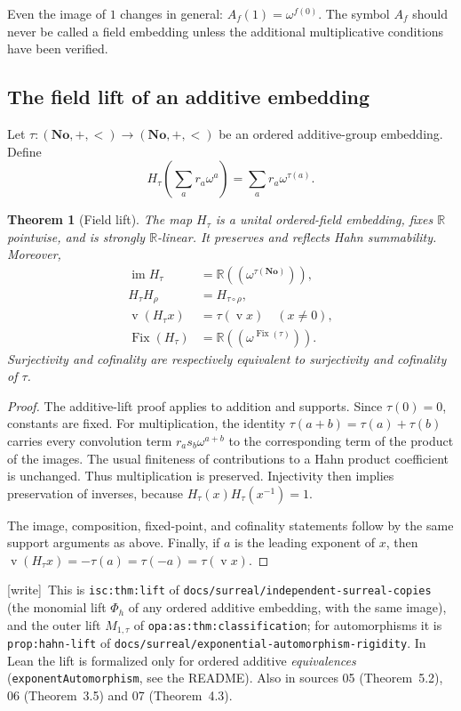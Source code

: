 \documentclass[11pt,a4paper]{article}
\numberwithin{equation}{section}
\theoremstyle{plain}
\newtheorem{theorem}{Theorem}[section]
\theoremstyle{definition}
\theoremstyle{remark}
\newcommand{\No}{\mathbf{No}}
\newcommand{\R}{\mathbb{R}}
\newcommand{\Fix}{\operatorname{Fix}}
\newcommand{\im}{\operatorname{im}}
\newcommand{\NF}[1]{\R((\omega^{#1}))}
\newcommand{\val}{\operatorname{v}}
\newcommand{\code}[1]{\texttt{\small #1}}
\newcommand{\lbl}[1]{\nolinkurl{#1}}%
\newcommand{\fn}[1]{\nolinkurl{#1}}%
\newcommand{\wtag}{\textup{\textsf{[write]}}}%
\newenvironment{wnote}{\par\smallskip\noindent\wtag\ }{\par\smallskip}
\begin{document}
Even the image of $1$ changes in general: $A_f(1)=\omega^{f(0)}$.
The symbol $A_f$ should never be called a field embedding unless the
additional multiplicative conditions have been verified.

\subsection{The field lift of an additive embedding}
Let $\tau:(\No,+,<)\to(\No,+,<)$ be an ordered additive-group embedding.
Define
\begin{equation}\label{sse:eq:fieldlift}
 H_\tau\left(\sum_a r_a\omega^a\right)
       =\sum_a r_a\omega^{\tau(a)}.
\end{equation}

\begin{theorem}[Field lift]\label{sse:thm:fieldlift}
The map $H_\tau$ is a unital ordered-field embedding, fixes $\R$ pointwise,
and is strongly $\R$-linear. It preserves and reflects Hahn summability.
Moreover,
\begin{align}
 \im H_\tau&=\NF{\tau(\No)},\label{sse:eq:fieldimage}\\
 H_\tau H_\rho&=H_{\tau\circ\rho},\label{sse:eq:fieldfunctor}\\
 \val(H_\tau x)&=\tau(\val x)\quad(x\ne0),\label{sse:eq:fieldvalue}\\
 \Fix(H_\tau)&=\NF{\Fix(\tau)}.\label{sse:eq:fieldfixed}
\end{align}
Surjectivity and cofinality are respectively equivalent to surjectivity
and cofinality of $\tau$.
\end{theorem}
\begin{proof}
The additive-lift proof applies to addition and supports. Since
$\tau(0)=0$, constants are fixed. For multiplication, the identity
$\tau(a+b)=\tau(a)+\tau(b)$ carries every convolution term
$r_as_b\omega^{a+b}$ to the corresponding term of the product of the
images. The usual finiteness of contributions to a Hahn product coefficient
is unchanged. Thus multiplication is preserved. Injectivity then implies
preservation of inverses, because $H_\tau(x)H_\tau(x^{-1})=1$.

The image, composition, fixed-point, and cofinality statements follow by
the same support arguments as above. Finally, if $a$ is the leading
exponent of $x$, then
$\val(H_\tau x)=-\tau(a)=\tau(-a)=\tau(\val x)$.
\end{proof}
\begin{wnote}This is \lbl{isc:thm:lift} of \fn{docs/surreal/independent-surreal-copies} (the monomial lift $\Phi_h$ of any ordered additive embedding, with the same image), and the outer lift $M_{1,\tau}$ of \lbl{opa:as:thm:classification}; for automorphisms it is \lbl{prop:hahn-lift} of \fn{docs/surreal/exponential-automorphism-rigidity}. In Lean the lift is formalized only for ordered additive \emph{equivalences} (\code{exponentAutomorphism}, see the README). Also in sources 05 (Theorem~5.2), 06 (Theorem~3.5) and 07 (Theorem~4.3).\end{wnote}
\end{document}
